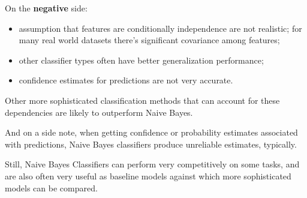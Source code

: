 On the \textbf{negative} side:
\begin{itemize}
\item assumption that features are conditionally independence are not realistic; for many real world datasets there's significant covariance among features;
\item other classifier types often have better generalization performance;
\item confidence estimates for predictions are not very accurate.
\end{itemize}

Other more sophisticated classification methods that can account for these dependencies are likely to outperform Naive Bayes. 

And on a side note, when getting confidence or probability estimates associated with predictions, Naive Bayes classifiers produce unreliable estimates, typically. 

Still, Naive Bayes Classifiers can perform very competitively on some tasks, and are also often very useful as baseline models against which more sophisticated models can be compared. 